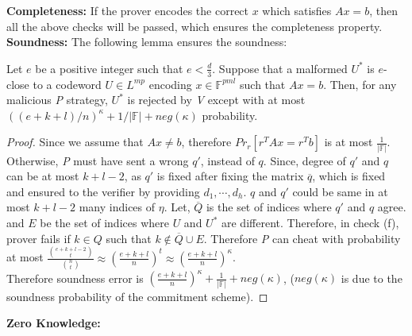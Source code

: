 \textbf{Completeness:} If the prover encodes the correct $x$ which satisfies $Ax=b$, then all the above checks will be passed, which ensures the completeness property.\\

\textbf{Soundness:} The following lemma ensures the soundness:

\begin{lemma}
	Let $e$ be a positive integer such that $e < \frac{d}{3}$. Suppose that a malformed $U^*$ is $e$-close to a codeword $U\in L^{mp}$ encoding $x\in \mathbb{F}^{pml}$ such that $Ax=b$. Then, for any malicious \textit{P} strategy, $U^*$ is rejected by \textit{V} except with at most $((e +k +l)/n)^{\kappa} +1/|\mathbb{F}|+neg(\kappa)$ probability.
\end{lemma}

\begin{proof}
	Since we assume that $Ax\neq b$, therefore $Pr_r[r^TAx=r^Tb]$ is at most $\frac{1}{|\mathbb{F}|}$.\\
	 Otherwise, \textit{P} must have sent a wrong $q'$, instead of $q$. Since, degree of $q'$ and $q$ can be at most $k+l-2$, as $q'$ is fixed after fixing the matrix $\overline{q}$, which is fixed and ensured to the verifier by providing $d_1,\cdots, d_h$. $q$ and $q'$ could be same in at most $k+l-2$ many indices of $\eta$. Let, $\overline{Q}$ is the set of indices where $q'$ and $q$ agree. and $E$ be the set of indices where $U$ and $U^*$ are different. Therefore, in check (f), prover fails if $k\in Q$ such that $k\notin \overline{Q}\cup E$. Therefore \textit{P} can cheat with probability at most $\frac{\binom{e+k+l-2}{t}}{\binom{n}{t}}\approx (\frac{e+k+l}{n})^t\approx (\frac{e+k+l}{n})^{\kappa}$.\\
	 Therefore soundness error is $(\frac{e+k+l}{n})^{\kappa}+\frac{1}{|\mathbb{F}|}+neg(\kappa)$, ($neg(\kappa)$ is due to the soundness probability of the commitment scheme).
\end{proof}

\textbf{Zero Knowledge:} %

